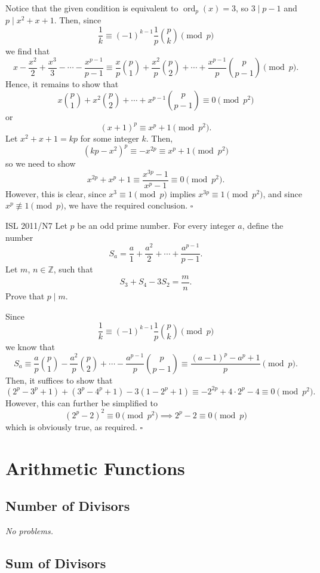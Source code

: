 \documentclass{article}
\newcommand{\noproblems}{\emph{No problems.}}
\begin{document}
Notice that the given condition is equivalent to $\operatorname{ord}_p(x) = 3$, so $3 \mid p-1$ and $p \mid x^2+x+1$. Then, since \[\dfrac{1}{k} \equiv (-1)^{k-1}\dfrac{1}{p}\binom{p}{k} \pmod{p}\] we find that \[x -\dfrac{x^2}{2} +\dfrac{x^3}{3} - \cdots - \dfrac{x^{p-1}}{p-1} \equiv \dfrac{x}{p}\binom{p}{1}+\dfrac{x^2}{p}\binom{p}{2}+\cdots +\dfrac{x^{p-1}}{p}\binom{p}{p-1} \pmod{p}.\] Hence, it remains to show that \[x\binom{p}{1}+x^2\binom{p}{2}+\cdots+x^{p-1}\binom{p}{p-1} \equiv 0 \pmod{p^2}\] or \[(x+1)^p \equiv x^p+1 \pmod{p^2}.\] Let $x^2+x+1 = kp$ for some integer $k$. Then, \[(kp-x^2)^p \equiv -x^{2p} \equiv x^p + 1\pmod{p^2}\] so we need to show \[x^{2p}+x^p+1 \equiv \dfrac{x^{3p}-1}{x^p-1} \equiv 0 \pmod{p^2}.\] However, this is clear, since $x^3 \equiv 1 \pmod{p}$ implies $x^{3p} \equiv 1 \pmod{p^2}$, and since $x^p \not\equiv 1 \pmod{p}$, we have the required conclusion. $\square$

\begin{problem}[2.14.21]{ISL 2011/N7}
Let $p$ be an odd prime number. For every integer $a$, define the number \[S_a = \dfrac{a}{1}+\dfrac{a^2}{2}+\cdots+\dfrac{a^{p-1}}{p-1}.\] Let $m$, $n \in \mathbb{Z}$, such that \[S_3 + S_4 - 3S_2 = \dfrac{m}{n}.\] Prove that $p \mid m$.
\end{problem}

Since \[\dfrac{1}{k} \equiv (-1)^{k-1}\dfrac{1}{p}\binom{p}{k} \pmod{p}\] we know that \[S_a \equiv \dfrac{a}{p}\binom{p}{1} - \dfrac{a^2}{p}\binom{p}{2} + \cdots - \dfrac{a^{p-1}}{p}\binom{p}{p-1} \equiv \dfrac{(a-1)^p - a^p + 1}{p}\pmod{p}.\] Then, it suffices to show that \[(2^p-3^p+1)+(3^p-4^p+1)-3(1-2^p+1) \equiv -2^{2p}+4\cdot 2^p-4 \equiv 0 \pmod{p^2}.\] However, this can further be simplified to \[(2^p-2)^2 \equiv 0 \pmod{p^2} \implies 2^p - 2 \equiv 0 \pmod{p}\] which is obviously true, as required. $\square$

\newpage

\section{Arithmetic Functions}

\subsection{Number of Divisors}

\noproblems

\subsection{Sum of Divisors}
\end{document}
